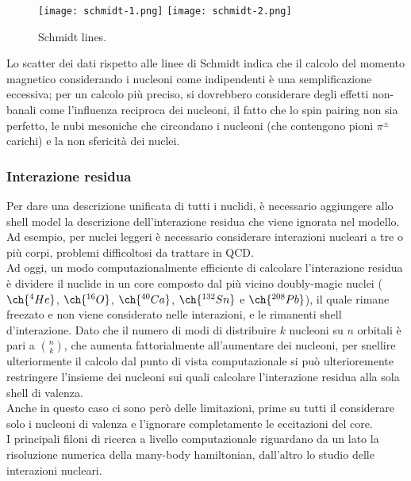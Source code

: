 \begin{figure}[!t]
	\texttt{[image: schmidt-1.png]}
	\texttt{[image: schmidt-2.png]}
	\caption{Schmidt lines.}
	\label{schmidt}
\end{figure}

Lo scatter dei dati rispetto alle linee di Schmidt indica che il calcolo del momento magnetico considerando i nucleoni come indipendenti è una semplificazione eccessiva; per un calcolo più preciso, si dovrebbero considerare degli effetti non-banali come l'influenza reciproca dei nucleoni, il fatto che lo spin pairing non sia perfetto, le nubi mesoniche che circondano i nucleoni (che contengono pioni $ \pi^{\pm} $ carichi) e la non sfericità dei nuclei.

\subsubsection{Interazione residua}

Per dare una descrizione unificata di tutti i nuclidi, è necessario aggiungere allo shell model la descrizione dell'interazione residua che viene ignorata nel modello. Ad esempio, per nuclei leggeri è necessario considerare interazioni nucleari a tre o più corpi, problemi difficoltosi da trattare in QCD.\\
Ad oggi, un modo computazionalmente efficiente di calcolare l'interazione residua è dividere il nuclide in un core composto dal più vicino doubly-magic nuclei ($ \ch{^4He} $, $ \ch{^{16}O} $, $ \ch{^{40}Ca} $, $ \ch{^{132}Sn} $ e $ \ch{^{208}Pb} $), il quale rimane freezato e non viene considerato nelle interazioni, e le rimanenti shell d'interazione. Dato che il numero di modi di distribuire $ k $ nucleoni su $ n $ orbitali è pari a $ \binom{n}{k} $, che aumenta fattorialmente all'aumentare dei nucleoni, per snellire ulteriormente il calcolo dal punto di vista computazionale si può ulterioremente restringere l'insieme dei nucleoni sui quali calcolare l'interazione residua alla sola shell di valenza.\\
Anche in questo caso ci sono però delle limitazioni, prime su tutti il considerare solo i nucleoni di valenza e l'ignorare completamente le eccitazioni del core.\\
I principali filoni di ricerca a livello computazionale riguardano da un lato la risoluzione numerica della many-body hamiltonian, dall'altro lo studio delle interazioni nucleari.










